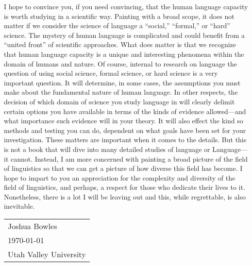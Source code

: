 \documentclass[11pt]{book}%
\theoremstyle{plain}
\numberwithin{equation}{section}
\theoremstyle{definition}
\newtheorem{phrase string}{Phrase String}
\begin{document}
I hope to convince you, if you need convincing, that the human language capacity is worth studying in a scientific way. Painting with a broad scope, it does not matter if we consider the science of language a ``social,'' ``formal,'' or ``hard'' science. The mystery of human language is complicated and could benefit from a ``united front'' of scientific approaches. What does matter is that we recognize that human language capacity is a unique and interesting phenomena within the domain of humans and nature. Of course, internal to research on language the question of using social science, formal science, or hard science is a very important question. It will determine, in some cases, the assumptions you must make about the fundamental nature of human language. In other respects, the decision of which domain of science you study language in will clearly delimit certain options you have available in terms of the kinds of evidence allowed---and what importance such evidence will in your theory. It will also effect the kind so methods and testing you can do, dependent on what goals have been set for your investigation. These matters are important when it comes to the details. But this is not a book that will dive into many detailed studies of language or Language---it cannot. Instead, I am more concerned with painting a broad picture of the field of linguistics so that we can get a picture of how diverse this field has become. I hope to impart to you an appreciation for the complexity and diversity of the field of linguistics, and perhaps, a respect for those who dedicate their lives to it. Nonetheless, there is a lot I will be leaving out and this, while regrettable, is also inevitable.\\

\begin{tabular}{|p{5cm}|}
\hline
Joshua Bowles\\
\today\\
Utah Valley University\\
\hline
\end{tabular}
 
\mainmatter

\end{document}
